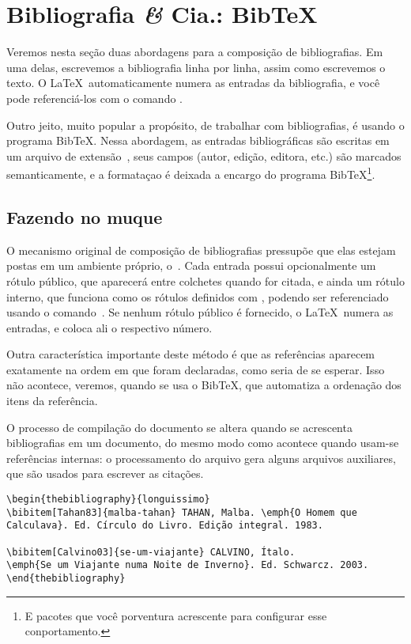 \section{Bibliografia {\it \&} Cia.: Bib\TeX}\label{sec:biblio}

Veremos nesta seção duas abordagens para a composição de
bibliografias. Em uma delas, escrevemos a bibliografia linha por
linha, assim como escrevemos o texto. O \LaTeX\ automaticamente 
numera as entradas da bibliografia, e você pode referenciá-los com o
comando .

Outro jeito, muito popular a propósito, de trabalhar com bibliografias,
é usando o programa Bib\TeX. Nessa abordagem, as entradas
bibliográficas são escritas em um arquivo de extensão~,
seus campos (autor, edição, editora, etc.) são marcados
semanticamente, e a formataçao é deixada a encargo do programa
Bib\TeX\footnote{E pacotes que você porventura acrescente para
  configurar esse conportamento.}.

\subsection{Fazendo no muque}

O mecanismo original de composição de bibliografias pressupõe que elas
estejam postas em um ambiente próprio,
o~. Cada entrada possui opcionalmente um
rótulo público, que aparecerá entre colchetes quando for citada, e
ainda um rótulo interno, que funciona como os rótulos definidos com
, podendo ser referenciado usando o
comando~. Se nenhum rótulo
público é fornecido, o \LaTeX\ numera as entradas, e coloca ali o
respectivo número.

Outra característica importante deste método é que as referências
aparecem exatamente na ordem em que foram declaradas, como seria de se
esperar. Isso não acontece, veremos, quando se usa o Bib\TeX, que
automatiza a ordenação dos itens da referência.

O processo de compilação do documento se altera quando se acrescenta
bibliografias em um documento, do mesmo modo como acontece quando
usam-se referências internas: o processamento do arquivo gera alguns
arquivos auxiliares, que são usados para escrever as citações.

\begin{verbatim}
\begin{thebibliography}{longuissimo}
\bibitem[Tahan83]{malba-tahan} TAHAN, Malba. \emph{O Homem que
Calculava}. Ed. Círculo do Livro. Edição integral. 1983.

\bibitem[Calvino03]{se-um-viajante} CALVINO, Ítalo. 
\emph{Se um Viajante numa Noite de Inverno}. Ed. Schwarcz. 2003.
\end{thebibliography}
\end{verbatim}

